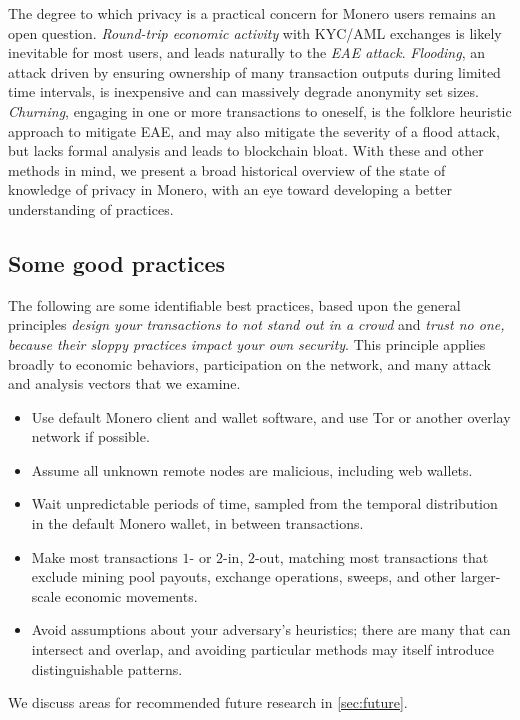 \documentclass{article}
\theoremstyle{definition}
\begin{document}
The degree to which privacy is a practical concern for Monero users remains an open question.
\textit{Round-trip economic activity} with KYC/AML exchanges is likely inevitable for most users, and leads naturally to the \textit{EAE attack}.
\textit{Flooding}, an attack driven by ensuring ownership of many transaction outputs during limited time intervals, is inexpensive and can massively degrade anonymity set sizes.
\textit{Churning}, engaging in one or more transactions to oneself, is the folklore heuristic approach to mitigate EAE, and may also mitigate the severity of a flood attack, but lacks formal analysis and leads to blockchain bloat.
With these and other methods in mind, we present a broad historical overview of the state of knowledge of privacy in Monero, with an eye toward developing a better understanding of practices.


\subsection{Some good practices}

The following are some identifiable best practices, based upon the general principles \textit{design your transactions to not stand out in a crowd} and \textit{trust no one, because their sloppy practices impact your own security}.
This principle applies broadly to economic behaviors, participation on the network, and many attack and analysis vectors that we examine.
\begin{itemize}
\item Use default Monero client and wallet software, and use Tor or another overlay network if possible.
\item Assume all unknown remote nodes are malicious, including web wallets.
\item Wait unpredictable periods of time, sampled from the temporal distribution in the default Monero wallet, in between transactions.
\item Make most transactions $1$- or $2$-in, $2$-out, matching most transactions that exclude mining pool payouts, exchange operations, sweeps, and other larger-scale economic movements.
\item Avoid assumptions about your adversary's heuristics; there are many that can intersect and overlap, and avoiding particular methods may itself introduce distinguishable patterns.
\end{itemize}

We discuss areas for recommended future research in \ref{sec:future}.
\end{document}
